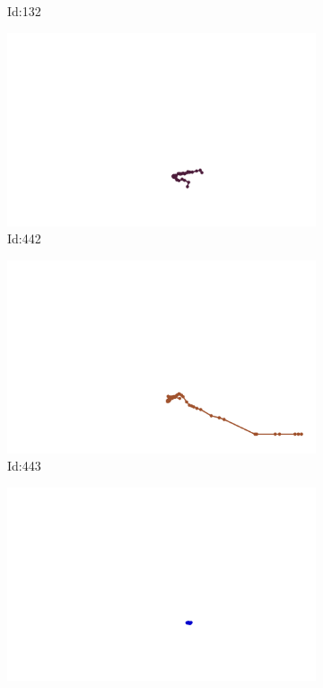 \documentclass[12pt,twoside]{report}
\begin{document}
\begin{figure}
\begin{subfigure}[b]{0.20\textwidth}
\caption{Id:132}
\end{subfigure}
\begin{subfigure}[b]{0.20\textwidth}
\centering
\includegraphics[width=\textwidth]{../../trajectories/442.png}
\caption{Id:442}
\end{subfigure}
\begin{subfigure}[b]{0.20\textwidth}
\centering
\includegraphics[width=\textwidth]{../../trajectories/443.png}
\caption{Id:443}
\end{subfigure}
\begin{subfigure}[b]{0.20\textwidth}
\centering
\includegraphics[width=\textwidth]{../../trajectories/658.png}

\end{subfigure}
\end{figure}
\end{document}
